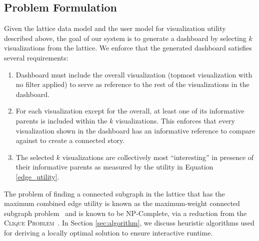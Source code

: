 \subsection{Problem Formulation}
Given the lattice data model and the user model for visualization utility described above, the goal of our system is to generate a dashboard by selecting $k$ visualizations from the lattice. We enforce that the generated dashboard satisfies several requirements: 
 \begin{enumerate}
 	\item Dashboard must include the overall visualization (topmost visualization with no filter applied) to serve as reference to the rest of the visualizations in the dashboard.
 	\item For each visualization except for the overall, at least one of its informative parents is included within the $k$ visualizations. This enforces that every visualization shown in the dashboard has an informative reference to compare against to create a connected story.
 	\item The selected $k$ visualizations are collectively most ``interesting'' in presence of their informative parents as measured by the utility in Equation \ref{edge_utility}. 
\end{enumerate}
 The problem of finding a connected subgraph in the lattice that has the maximum combined edge utility is  known as the maximum-weight connected subgraph problem~\cite{ErnstAlthaus2009} and is known to be NP-Complete, via a reduction from the \textsc{Clique Problem}~\cite{Parameswaran2010}. In Section \ref{sec:algorithm}, we discuss heuristic algorithms used for deriving a locally optimal solution to ensure interactive runtime. 